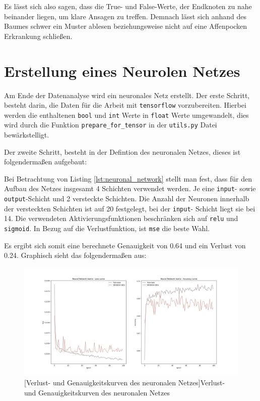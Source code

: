 \documentclass[13pt,a4paper, listof=entryprefix, bibliography=totocnumbered,toc=listofnumbered,lof=listofnumbered]{scrartcl}
\begin{document}
	Es lässt sich also sagen, dass die True- und False-Werte, der Endknoten zu nahe beinander liegen, um klare Ansagen zu treffen. 
	Demnach lässt sich anhand des Baumes schwer ein Muster ablesen beziehungsweise nicht auf eine Affenpocken Erkrankung schließen.  

	\section{Erstellung eines Neurolen Netzes}
		\label{ch:neuronlaes_netz}

	Am Ende der Datenanalyse wird ein neuronales Netz erstellt. Der erste Schritt, besteht darin, die Daten für die Arbeit mit 
	\lstinline{tensorflow} vorzubereiten. Hierbei werden die enthaltenen \lstinline{bool} und \lstinline{int} Werte in 
	\lstinline{float} Werte umgewandelt, dies wird durch die Funktion \lstinline{prepare_for_tensor}
	in der \lstinline{utils.py} Datei bewärkstelligt. 
	
	Der zweite Schritt, besteht in der Defintion des neuronalen Netzes, dieses ist folgendermaßen aufgebaut:

	

	Bei Betrachtung von Listing \ref{lst:neuronal_network} stellt man fest, dass für den Aufbau des Netzes insgesamt 4 
	Schichten verwendet werden. Je eine \lstinline{input}- sowie \lstinline{output}-Schicht und 2 versteckte Schichten.
	Die Anzahl der Neuronen innerhalb der versteckten Schichten ist auf 20 festgelegt, bei der \lstinline{input}-
	Schicht liegt sie bei 14. Die verwendeten Aktivierungsfunktionen beschränken sich auf \lstinline{relu} und 
	\lstinline{sigmoid}. In Bezug auf die Verlustfunktion, ist \lstinline{mse} die beste Wahl. 
	
	Es ergibt sich somit eine berechnete Genauigkeit von 0.64 und ein Verlust von 0.24. Graphisch sieht das 
	folgendermaßen aus: 

	\begin{figure}[H]
		\centering
		\includegraphics[width=0.8\linewidth]{Bilder/neural_network.png}
		[Verlust- und Genauigkeitskurven des neuronalen Netzes]{Verlust- und Genauigkeitskurven des neuronalen Netzes}
		\label{fig:neural_network}
	\end{figure}
\end{document}
